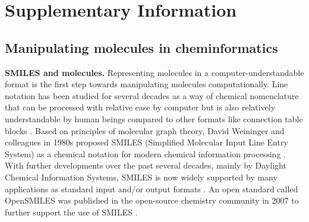 \documentclass{article}
\begin{document}
\section{Supplementary Information} \label{sec:SI}



\subsection{Manipulating molecules in cheminformatics}
\textbf{SMILES and molecules.}
Representing molecules in a computer-understandable format is the first step towards manipulating molecules computationally. 
Line notation has been studied for several decades as a way of chemical nomenclature that can be processed with relative ease by computer but is also relatively understandable by human beings compared to other formats like connection table blocks \citep{panico1993guide, wiswesser1954line, dalby1992description}. 
Based on principles of molecular graph theory, David Weininger and colleagues in 1980s proposed SMILES (Simplified Molecular Input Line Entry System) as a chemical notation for modern chemical information processing \citep{weininger1988smiles, weininger1989smiles}.   
With further developments over the past several decades, mainly by Daylight Chemical Information Systems, SMILES is now widely supported by many applications as standard input and/or output formats \citep{weininger1990smiles, steinbeck2003chemistry, o2011open, daylightsmiles}. An open standard called OpenSMILES was published in the open-source chemistry community in 2007 to further support the use of SMILES \citep{opensmiles, weininger1988smiles}.
\end{document}

